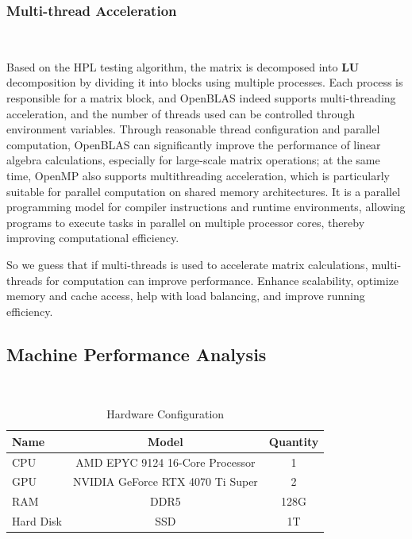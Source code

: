 \subsubsection{Multi-thread Acceleration}
\ 

Based on the HPL testing algorithm, the matrix is decomposed into $\mathbf{LU}$ decomposition by dividing it into blocks using multiple processes. Each process is responsible for a matrix block, and OpenBLAS indeed supports multi-threading acceleration, and the number of threads used can be controlled through environment variables. 
Through reasonable thread configuration and parallel computation, OpenBLAS can significantly improve the performance of linear algebra calculations, especially for large-scale matrix operations; at the same time, OpenMP also supports multithreading acceleration, which is particularly suitable for parallel computation on shared memory architectures. 
It is a parallel programming model for compiler instructions and runtime environments, allowing programs to execute tasks in parallel on multiple processor cores, thereby improving computational efficiency.

So we guess that if multi-threads is used to accelerate matrix calculations, multi-threads for computation can improve performance. 
Enhance scalability, optimize memory and cache access, help with load balancing, and improve running efficiency.

\subsection{Machine Performance Analysis}
\ 

\begin{table}[htbp]
\centering
\caption{Hardware Configuration}
\label{tab:HPLHard}
\begin{tabular}{|l|c|c|}
\hline
\rowcolor{myyellow}
\textbf{Name} & \textbf{Model} & \textbf{Quantity} \\
\hline
CPU & AMD EPYC 9124 16-Core Processor & 1 \\
\hline
GPU & NVIDIA GeForce RTX 4070 Ti Super & 2 \\
\hline
RAM & DDR5 & 128G \\
\hline
Hard Disk & SSD & 1T \\
\hline
\end{tabular}
\end{table}


